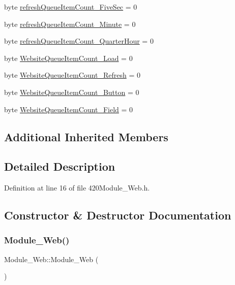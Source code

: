 \begin{DoxyCompactItemize}
\item 
byte \hyperlink{class_module___web_a2a7e9810e294613a9cd7d829c5268e96}{refresh\+Queue\+Item\+Count\+\_\+\+Five\+Sec} = 0
\item 
byte \hyperlink{class_module___web_aca1bbce9dbb6717d0a2ad5a3709d3af6}{refresh\+Queue\+Item\+Count\+\_\+\+Minute} = 0
\item 
byte \hyperlink{class_module___web_a177299af4bddaa3d928114f93a80b08a}{refresh\+Queue\+Item\+Count\+\_\+\+Quarter\+Hour} = 0
\item 
byte \hyperlink{class_module___web_a6c6ac44b7d6c9a8ffa4697bf8c21e2f4}{Website\+Queue\+Item\+Count\+\_\+\+Load} = 0
\item 
byte \hyperlink{class_module___web_adb4efad0cc844e3444b2c13706811774}{Website\+Queue\+Item\+Count\+\_\+\+Refresh} = 0
\item 
byte \hyperlink{class_module___web_a9a2c72321678f0453362283e6c3d2dd6}{Website\+Queue\+Item\+Count\+\_\+\+Button} = 0
\item 
byte \hyperlink{class_module___web_a4435956ad322d6de0e6858ba6e81da22}{Website\+Queue\+Item\+Count\+\_\+\+Field} = 0
\end{DoxyCompactItemize}
\subsection*{Additional Inherited Members}


\subsection{Detailed Description}


Definition at line 16 of file 420\+Module\+\_\+\+Web.\+h.



\subsection{Constructor \& Destructor Documentation}
\mbox{\label{class_module___web_ac0b37fdb18188955c71b17767cfe1b29}} 
\subsubsection{\texorpdfstring{Module\+\_\+\+Web()}{Module\_Web()}\hspace{0.1cm}{\footnotesize\ttfamily [1/2]}}
{\footnotesize\ttfamily Module\+\_\+\+Web\+::\+Module\+\_\+\+Web (\begin{DoxyParamCaption}{ }\end{DoxyParamCaption})}




